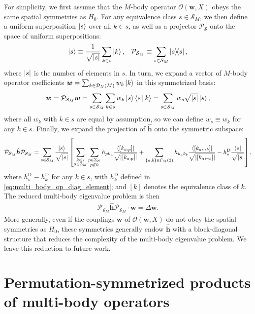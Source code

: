 \documentclass[nofootinbib,notitlepage,11pt]{revtex4-2}
\renewcommand{\t}{\text} %
\newcommand{\f}[2]{\dfrac{#1}{#2}} %
\newcommand{\p}[1]{\left(#1\right)} %
\renewcommand{\sp}[1]{\left[#1\right]} %
\renewcommand{\set}[1]{\left\{#1\right\}} %
\newcommand{\bk}{\Braket} %
\renewcommand{\c}{\cdot} %
\newcommand{\m}{\bm} %
\newcommand{\1}{\mathds{1}}
\newcommand{\C}{\mathcal{C}}
\newcommand{\D}{\mathcal{D}}
\renewcommand{\O}{\mathcal{O}}
\renewcommand{\P}{\mathcal{P}}
\renewcommand{\S}{\mathcal{S}}
\newcommand{\ZZ}{\mathbb{Z}}
\newcommand{\lra}{\leftrightarrow}
\begin{document}
For simplicity, we first assume that the $M$-body operator
$\O\p{\m w,X}$ obeys the same spatial symmetries as $H_0$.  For any
equivalence class $s\in\S_M$, we then define a uniform superposition
$\ket{s}$ over all $k\in s$, as well as a projector $\P_\S$ onto the
space of uniform superpositions:
\begin{align}
  \ket{s} \equiv \f1{\sqrt{\abs{s}}} \sum_{k\in s} \ket{k},
  &&
  \P_{\S_M} \equiv \sum_{s\in\S_M} \op{s},
\end{align}
where $\abs{s}$ is the number of elements in $s$.  In turn, we expand
a vector of $M$-body operator coefficients
$\m w=\sum_{k\in\D_N\p{M}}w_k\ket{k}$ in this symmetrized basis:
\begin{align}
  \m w = \P_{\S_M} \m w
  = \sum_{s\in\S_M} \sum_{k\in s} w_k \ket{s} \bk{s|k}
  = \sum_{s\in\S_M} w_s \sqrt{\abs{s}} \ket{s},
\end{align}
where all $w_k$ with $k\in s$ are equal by assumption, so we can
define $w_s\equiv w_k$ for any $k\in s$.  Finally, we expand the
projection of $\hat{\m h}$ onto the symmetric subspace:
\begin{align}
  \P_{\S_M} \hat{\m h} \P_{\S_M}
  = \sum_{s\in\S_M} \f{\ket{s}}{\sqrt{\abs{s}}} \sp{
    \sum_{\substack{k\in s\\a\in\ZZ_M}}
    \sum_{\substack{p\in\ZZ_N\\p\notin k}}
    h_{p k_a} \f{\bra{\sp{k_{a:p}}}}{\sqrt{\abs{\sp{k_{a:p}}}}}
    + \sum_{\set{a,b}\in\C_M\p{2}} h_{k_ak_b}
    \f{\bra{\sp{k_{a\lra b}}}}{\sqrt{\abs{\sp{k_{a\lra b}}}}}
    - h^{\t{D}}_s \f{\bra{s}}{\sqrt{\abs{s}}}},
\end{align}
where $h^{\t{D}}_s\equiv h^{\t{D}}_k$ for any $k\in s$, with
$h^{\t{D}}_k$ defined in \eqref{eq:multi_body_op_diag_element}; and
$\sp{k}$ denotes the equivalence class of $k$.  The reduced multi-body
eigenvalue problem is then
\begin{align}
  \P_{\S_M} \hat{\m h} \P_{\S_M} \c \m w = \Delta \m w.
\end{align}
More generally, even if the couplings $\m w$ of $\O\p{\m w,X}$ do not
obey the spatial symmetries as $H_0$, these symmetries generally endow
$\hat{\m h}$ with a block-diagonal structure that reduces the
complexity of the multi-body eigenvalue problem.  We leave this
reduction to future work.  %

\section{Permutation-symmetrized products of multi-body operators}
\label{sec:operator_product}
\end{document}
